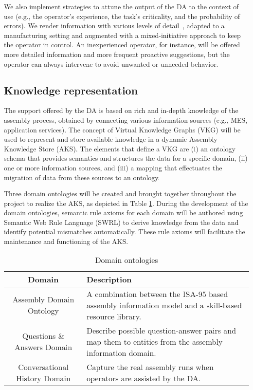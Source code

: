 We also implement strategies to attune the output of the DA to the context of use (e.g., the operator's experience, the task's criticality, and the probability of errors). We render information with various levels of detail~\cite{Mezhoudi2015AnAA,10.1145/3332165.3347945}, adapted to a manufacturing setting and augmented with a mixed-initiative approach to keep the operator in control. An inexperienced operator, for instance, will be offered more detailed information and more frequent proactive suggestions, but the operator can always intervene to avoid unwanted or unneeded behavior.

\subsection{Knowledge representation}
The support offered by the DA is based on rich and in-depth knowledge of the assembly process, obtained by connecting various information sources (e.g., MES, application services). The concept of Virtual Knowledge Graphs (VKG) \cite{xiao2019VirtualKnowledgeGraphs} will be used to represent and store available knowledge in a dynamic Assembly Knowledge Store (AKS). The elements that define a VKG are (i) an ontology schema that provides semantics and structures the data for a specific domain, (ii) one or more information sources, and (iii) a mapping that effectuates the migration of data from these sources to an ontology. 

Three domain ontologies will be created and brought together throughout the project to realize the AKS, as depicted in Table \ref{tab:ontolgoies}. During the development of the domain ontologies, semantic rule axioms \cite{sormaz2019SIMPMUpperlevelOntology} for each domain will be authored using Semantic Web Rule Language (SWRL) to derive knowledge from the data and identify potential mismatches automatically. These rule axioms will facilitate the maintenance and functioning of the AKS.

\begin{table}
  \caption{Domain ontologies}
  \label{tab:ontolgoies}
  \begin{tabular}{cp{7cm}}
    \toprule
    Domain & Description\\
    \midrule
    Assembly Domain Ontology &  A combination between the ISA-95 based assembly information model \cite{claeys2018OntologicalModelManaging} and a skill-based resource library.\\ 
    Questions \& Answers Domain & Describe possible question-answer pairs and map them to entities from the assembly information domain. \\
    Conversational History Domain & Capture the real assembly runs when operators are assisted by the DA.\\
    \bottomrule
  \end{tabular}
\end{table}

